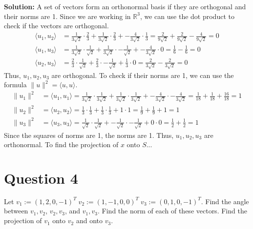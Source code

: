 \documentclass{article}
\begin{document}
\vspace{0.5cm}
\noindent\textbf{Solution:} A set of vectors form an orthonormal basis if they are orthogonal and their norms are 1.
Since we are working in $\mathbb{R}^3$, we can use the dot product to check if the vectors are orthogonal.
\begin{align*}
    \langle u_1, u_2 \rangle &= \frac{1}{3\sqrt{2}} \cdot \frac{2}{3} + \frac{1}{3\sqrt{2}} \cdot \frac{2}{3} + -\frac{4}{3\sqrt{2}} \cdot \frac{1}{3}
    = \frac{2}{9\sqrt{2}} + \frac{2}{9\sqrt{2}} - \frac{4}{9\sqrt{2}} = 0 \\
    \langle u_1, u_3 \rangle &= \frac{1}{3\sqrt{2}} \cdot \frac{1}{\sqrt{2}} + \frac{1}{3\sqrt{2}} \cdot -\frac{1}{\sqrt{2}} + -\frac{4}{3\sqrt{2}} \cdot 0 = \frac{1}{6} - \frac{1}{6} = 0 \\
        \langle u_2, u_3 \rangle &= \frac{2}{3} \cdot \frac{1}{\sqrt{2}} + \frac{2}{3} \cdot -\frac{1}{\sqrt{2}} + \frac{1}{3} \cdot 0 = \frac{2}{3\sqrt{2}} - \frac{2}{3\sqrt{2}} = 0
\end{align*}
Thus, $u_1, u_2, u_3$ are orthogonal.
To check if their norms are 1, we can use the formula $\|u\|^2 = \langle u, u \rangle$.
\begin{align*}
    \|u_1\|^2 &= \langle u_1, u_1 \rangle = \frac{1}{3\sqrt{2}} \cdot \frac{1}{3\sqrt{2}} + \frac{1}{3\sqrt{2}} \cdot \frac{1}{3\sqrt{2}} + -\frac{4}{3\sqrt{2}} \cdot -\frac{4}{3\sqrt{2}} = \frac{1}{18} + \frac{1}{18} + \frac{16}{18} = 1 \\
    \|u_2\|^2 &= \langle u_2, u_2 \rangle = \frac{1}{3} \cdot \frac{1}{3} + \frac{1}{3} \cdot \frac{1}{3} + 1 \cdot 1 = \frac{1}{9} + \frac{1}{9} + 1 = 1 \\
    \|u_3\|^2 &= \langle u_3, u_3 \rangle = \frac{1}{\sqrt{2}} \cdot \frac{1}{\sqrt{2}} + -\frac{1}{\sqrt{2}} \cdot -\frac{1}{\sqrt{2}} + 0 \cdot 0 = \frac{1}{2} + \frac{1}{2} = 1
\end{align*}
Since the squares of norms are 1, the norms are 1. Thus, $u_1, u_2, u_3$ are orthonormal.
To find the projection of $x$ onto $S$...


\newpage
\section*{Question 4}
Let $v_1 := (1, 2, 0, -1)^T \; v_2 := (1, -1, 0, 0)^T \; v_3 := (0, 1, 0, -1)^T$.
Find the angle between $v_1, v_2$, $v_2, v_3$, and $v_1, v_3$.
Find the norm of each of these vectors.
Find the projection of $v_1$ onto $v_2$ and onto $v_3$.
\end{document}

